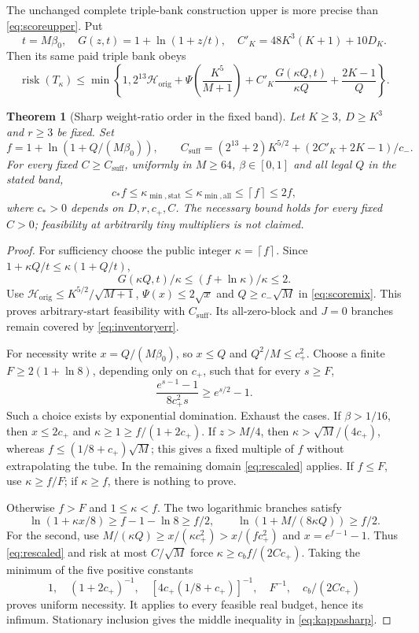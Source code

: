 \documentclass[11pt,letterpaper]{article}
\newtheorem{theorem}{Theorem}[section]
\theoremstyle{definition}\newtheorem{definition}[theorem]{Definition}
\theoremstyle{remark}\newtheorem{remark}[theorem]{Remark}
\newcommand{\ceil}[1]{\left\lceil #1\right\rceil}
\newcommand{\betaz}{\beta_0}
\begin{document}
The unchanged complete triple-bank construction upper is more precise than \eqref{eq:scoreupper}. Put
\[
 t=M\betaz,\quad G(z,t)=1+\ln(1+z/t),\quad
 C'_K=48K^3(K+1)+10D_K.
\]
Then its same paid triple bank obeys
\begin{equation}\label{eq:scoremix}
 \operatorname{risk}(T_\kappa)\le\min\left\{1,
 2^{13}\mathcal H_{\mathrm{orig}}+\Psi\left(\frac{K^5}{M+1}\right)
 +C'_K\frac{G(\kappa Q,t)}{\kappa Q}+\frac{2K-1}{Q}\right\}.
\end{equation}

\begin{theorem}[Sharp weight-ratio order in the fixed band]\label{thm:kappa}
Let $K\ge3$, $D\ge K^3$ and $r\ge3$ be fixed. Set
\[
 f=1+\ln(1+Q/(M\betaz)),\qquad
 C_{\mathrm{suff}}=(2^{13}+2)K^{5/2}+(2C'_K+2K-1)/c_-.
\]
For every fixed $C\ge C_{\mathrm{suff}}$, uniformly in $M\ge64$, $\beta\in[0,1]$ and all legal $Q$ in the stated band,
\begin{equation}\label{eq:kappasharp}
 c_*f\le\kappa_{\min,\mathrm{stat}}
 \le\kappa_{\min,\mathrm{all}}\le\ceil f\le2f,
\end{equation}
where $c_*>0$ depends on $D,r,c_+,C$. The necessary bound holds for every fixed $C>0$; feasibility at arbitrarily tiny multipliers is not claimed.
\end{theorem}
\begin{proof}
For sufficiency choose the public integer $\kappa=\ceil f$. Since $1+\kappa Q/t\le\kappa(1+Q/t)$,
\[
 G(\kappa Q,t)/\kappa\le(f+\ln\kappa)/\kappa\le2.
\]
Use $\mathcal H_{\mathrm{orig}}\le K^{5/2}/\sqrt{M+1}$, $\Psi(x)\le2\sqrt x$ and $Q\ge c_-\sqrt M$ in \eqref{eq:scoremix}. This proves arbitrary-start feasibility with $C_{\mathrm{suff}}$. Its all-zero-block and $J=0$ branches remain covered by \eqref{eq:inventoryerr}.

For necessity write $x=Q/(M\betaz)$, so $x\le Q$ and $Q^2/M\le c_+^2$. Choose a finite $F\ge2(1+\ln8)$, depending only on $c_+$, such that for every $s\ge F$,
\[
 \frac{e^{s-1}-1}{8c_+^2s}\ge e^{s/2}-1.
\]
Such a choice exists by exponential domination. Exhaust the cases. If $\beta>1/16$, then $x\le2c_+$ and $\kappa\ge1\ge f/(1+2c_+)$. If $z>M/4$, then $\kappa>\sqrt M/(4c_+)$, whereas $f\le(1/8+c_+)\sqrt M$; this gives a fixed multiple of $f$ without extrapolating the tube. In the remaining domain \eqref{eq:rescaled} applies. If $f\le F$, use $\kappa\ge f/F$; if $\kappa\ge f$, there is nothing to prove.

Otherwise $f>F$ and $1\le\kappa<f$. The two logarithmic branches satisfy
\[
 \ln(1+\kappa x/8)\ge f-1-\ln8\ge f/2,\qquad
 \ln(1+M/(8\kappa Q))\ge f/2.
\]
For the second, use $M/(\kappa Q)\ge x/(\kappa c_+^2)>x/(fc_+^2)$ and $x=e^{f-1}-1$. Thus \eqref{eq:rescaled} and risk at most $C/\sqrt M$ force $\kappa\ge c_bf/(2Cc_+)$. Taking the minimum of the five positive constants
\[
 1,\quad (1+2c_+)^{-1},\quad
 [4c_+(1/8+c_+)]^{-1},\quad F^{-1},\quad c_b/(2Cc_+)
\]
proves uniform necessity. It applies to every feasible real budget, hence its infimum. Stationary inclusion gives the middle inequality in \eqref{eq:kappasharp}.
\end{proof}
\end{document}
